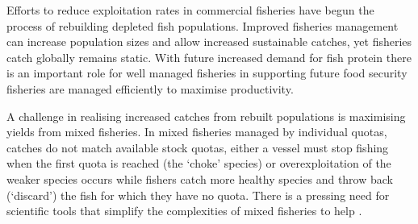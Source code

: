\documentclass[12pt]{article}
\begin{document}
\begin{linenumbers}


 Efforts to reduce exploitation rates in commercial fisheries
have begun the process of rebuilding depleted fish populations\cite{Worm2009}.
Improved fisheries management can increase
population sizes and allow increased sustainable catches, yet fisheries catch
globally remains static\cite{FAO2016}. With future increased demand for fish
protein there is an important role for well managed
fisheries in supporting future food
security\cite{Mcclanahan2015}
 fisheries are
managed efficiently to maximise productivity.

A challenge in realising increased catches
from rebuilt populations is maximising yields from mixed
fisheries\cite{Branch2008, Kuriyama2016, Ulrich2016}. In mixed
fisheries managed by
individual quotas,  catches do not match
available stock quotas, either a vessel must stop fishing when the first quota
is reached (the `choke' species) or overexploitation of the weaker species
occurs while fishers catch more healthy species and throw
back (`discard') the fish for which they have no quota\cite{Batsleer2015}.
There is a pressing need for scientific tools that
simplify the complexities of mixed fisheries to help . 


\end{linenumbers}
\end{document}
